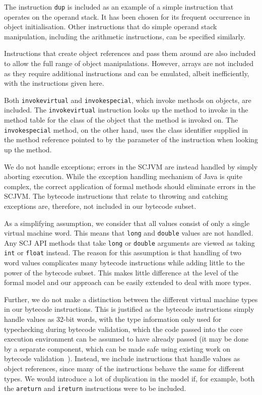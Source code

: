 The instruction \texttt{dup} is included as an example of a simple
instruction that operates on the operand stack.
It has been chosen for its frequent occurrence in object initialisation.
Other instructions that do simple operand stack manipulation,
including the arithmetic instructions, can be specified similarly.

Instructions that create object references and pass them around are
also included to allow the full range of object manipulations.
However, arrays are not included as they require additional
instructions and can be emulated, albeit inefficiently, with the
instructions given here.

Both \texttt{invokevirtual} and \texttt{invokespecial}, which invoke
methods on objects, are included.
The \texttt{invokevirtual} instruction looks up the method to invoke
in the method table for the class of the object that the method is
invoked on.
The \texttt{invokespecial} method, on the other hand, uses the class
identifier supplied in the method reference pointed to by the
parameter of the instruction when looking up the method.

We do not handle exceptions; errors in the SCJVM are instead handled
by simply aborting execution.
While the exception handling mechanism of Java is quite complex, the
correct application of formal methods should eliminate errors in the
SCJVM.
The bytecode instructions that relate to throwing and catching
exceptions are, therefore, not included in our bytecode subset.

As a simplifying assumption, we consider that all values consist of
only a single virtual machine word.
This means that \texttt{long} and \texttt{double} values are not
handled.
Any SCJ API methods that take \texttt{long} or \texttt{double}
arguments are viewed as taking \texttt{int} or \texttt{float} instead.
The reason for this assumption is that handling of two word values
complicates many bytecode instructions while adding little to the
power of the bytecode subset.
This makes little difference at the level of the formal model and our
approach can be easily extended to deal with more types.

Further, we do not make a distinction between the different virtual
machine types in our bytecode instructions.
This is justified as the bytecode instructions simply handle values as
32-bit words, with the type information only used for typechecking
during bytecode validation, which the code passed into the core
execution environment can be assumed to have already passed (it may be
done by a separate component, which can be made safe using existing
work on bytecode validation~\cite{klein2003, stark2001, coglio2000,
  xavier2003}). 
Instead, we include instructions that handle values as object
references, since many of the instructions behave the same for
different types.
We would introduce a lot of duplication in the model if, for example,
both the \texttt{areturn} and \texttt{ireturn} instructions were to be
included.

